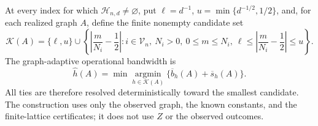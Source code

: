 At every index for which \(\mathcal H_{n,d}\ne\varnothing\), put \(\ell=d^{-1}\), \(u=\min\{d^{-1/2},1/2\}\), and, for each realized graph \(A\), define the finite nonempty candidate set
\[
 \mathcal K(A)=\{\ell,u\}\cup
 \left\{\left|\frac m{N_i}-\frac12\right|:
 i\in\mathcal V_n,\ N_i>0,\ 0\leq m\leq N_i,\
 \ell\leq\left|\frac m{N_i}-\frac12\right|\leq u\right\}.
\]
The graph-adaptive operational bandwidth is
\[
 \widehat h(A)=\min\operatorname*{argmin}_{h\in\mathcal K(A)}
 \{\overline b_h(A)+\overline s_h(A)\}.
\]
All ties are therefore resolved deterministically toward the smallest candidate.  The construction uses only the observed graph, the known constants, and the finite-lattice certificates; it does not use \(Z\) or the observed outcomes.